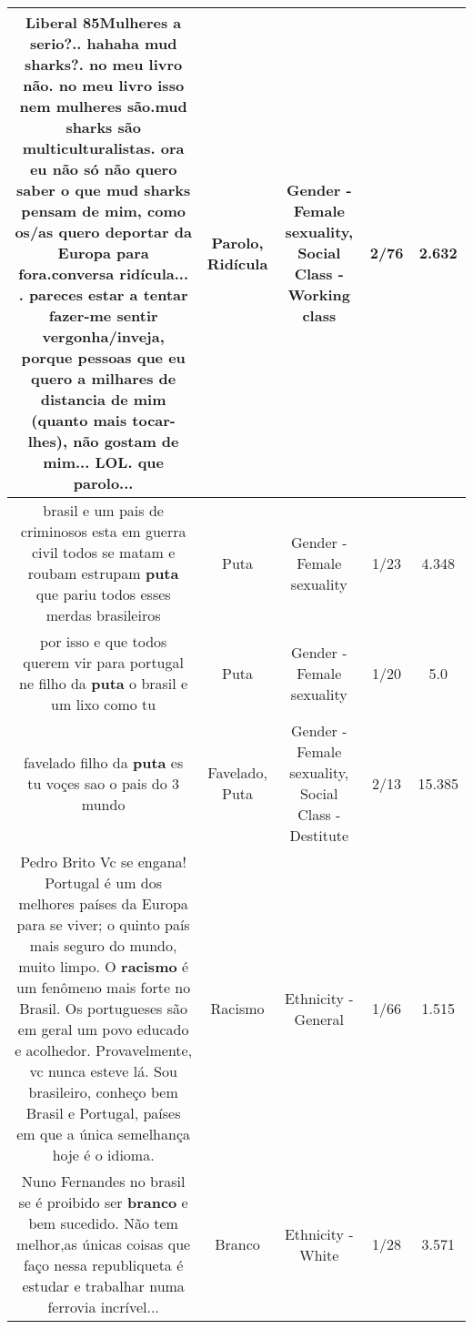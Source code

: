 \documentclass[11pt]{article}
\newlength\mylength
\begin{document}
\begin{center}
\begin{longtable}{|C{.65\mylength}|C{.30\mylength}|C{.12\mylength}|C{.12\mylength}|C{.12\mylength}|}
  \small Liberal 85Mulheres a serio?.. hahaha mud sharks?. no meu livro não. no meu livro isso nem mulheres são.mud sharks são multiculturalistas. ora eu não só não quero saber o que mud sharks pensam de mim, como os/as quero deportar da Europa para fora.conversa \textbf{ridícula}... . pareces estar a tentar fazer-me sentir vergonha/inveja, porque pessoas que eu quero a milhares de distancia de mim (quanto mais tocar-lhes), não gostam de mim... LOL. que \textbf{parolo}...\normalsize   & Parolo, Ridícula & Gender - Female sexuality, Social Class - Working class & 2/76 & 2.632 \\  \hline
  \small brasil e um pais de criminosos esta em guerra civil todos se matam e roubam estrupam \textbf{puta} que pariu todos esses merdas brasileiros\normalsize   & Puta & Gender - Female sexuality & 1/23 & 4.348 \\  \hline
  \small por isso e que todos querem vir para portugal ne filho da \textbf{puta} o brasil e um lixo como tu\normalsize   & Puta & Gender - Female sexuality & 1/20 & 5.0 \\  \hline
  \small favelado filho da \textbf{puta} es tu voçes sao o pais do 3 mundo\normalsize   & Favelado, Puta & Gender - Female sexuality, Social Class - Destitute & 2/13 & 15.385 \\  \hline
  \small Pedro Brito Vc se engana! Portugal é um dos melhores países da Europa para se viver; o quinto país mais seguro do mundo, muito limpo. O \textbf{racismo} é um fenômeno mais forte no Brasil. Os portugueses são em geral um povo educado e acolhedor. Provavelmente, vc nunca esteve lá. Sou brasileiro, conheço bem Brasil e Portugal, países em que a única semelhança hoje é o idioma.\normalsize   & Racismo & Ethnicity - General & 1/66 & 1.515 \\  \hline
  \small Nuno Fernandes no brasil se é proibido ser \textbf{branco} e bem sucedido. Não tem melhor,as únicas coisas que faço nessa republiqueta é estudar e trabalhar numa ferrovia incrível...\normalsize   & Branco & Ethnicity - White & 1/28 & 3.571 \\  \hline

\end{longtable}
\end{center}
\end{document}
